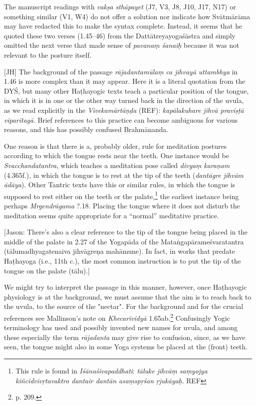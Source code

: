 \begin{ekdosis}
\begin{philcomm}[hp01_045]
The manuscript readings with \emph{vakṣa sthāpayet} (J7, V3, J8, J10, J17, N17) or something similar (V1, W4) do not offer a solution nor indicate how Svātmārāma may have redacted this to make the syntax complete. Instead, it seems that he quoted these two verses (1.45–46) from the Dattātreyayogaśāstra and simply omitted the next verse that made sense of \emph{pavanaṃ śanaiḥ} because it was not relevant to the posture itself.

[JH] The background of the passage \emph{rājadantamūlaṃ ca jihvayā uttambhya} in 1.46 is more complex
than it may appear. Here it is a literal quotation from the DYŚ, but many other Haṭhayogic texts
teach a particular position of the tongue, in which it is in one or the other way turned back in
the direction of the uvula, as we read explicitly in the \emph{Vivekamārtāṇḍa} (REF):
\emph{kapālakuhare jihvā praviṣṭā viparītagā}. Brief references to this practice can become
ambiguous for various reasons, and this has possibly confused Brahmānanda.

One reason is that there is a, probably older, rule for meditation postures according to which the
tongue rests near the teeth. One instance would be \emph{Svacchandatantra}, which teaches a
meditation pose called \emph{divyaṃ karaṇam} (4.365f.), in which the tongue is to rest at the tip
of the teeth (\emph{dantāgre jihvām ādāya}). Other Tantric texts have this or similar rules, in
which the tongue is supposed to rest either on the teeth or the palate,\footnote{This rule is
found in \emph{Iśānaśivapaddhati}: \emph{tāluke jihvāṃ saṃyojya kiñcidvivṛtavaktro dantair dantān
  asaṃspṛśan ṛjukāyaḥ}. REF} the earliest instance being perhaps \emph{Mrgendrāgama} ?.18.
Placing the tongue where it does not disturb the meditation seems quite appropriate for a
``normal'' meditative practice.

[Jason: There’s also a clear reference to the tip of the tongue being placed in the middle of the palate in 2.27 of the Yogapāda of the Mataṅgapārameśvaratantra (tālumadhyagatenaiva jihvāgreṇa mahāmune). In fact, in works that predate Haṭhayoga (i.e., 11th c.), the most common instruction is to put the tip of the tongue on the palate (tālu).]

We might try to interpret the passage in this manner, however, once Haṭhayogic physiology is at the
background, we must assume that the aim is to reach back to the uvula, to the source of the
"nectar".  For the background and for the crucial references see Mallinson's note on
\emph{Khecarīvidyā} 1.65ab.\footnote{p. 209.}  Confusingly Yogic terminology has used and possibly
invented new names for uvula, and among these especially the term \emph{rājadanta} may give rise to
confusion, since, as we have seen, the tongue might also in some Yoga systems be placed at the
(front) teeth.


\end{philcomm}
\end{ekdosis}
